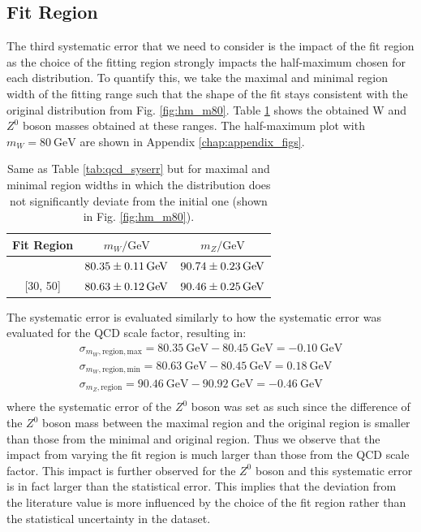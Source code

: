 \documentclass[a4paper]{report}
\numberwithin{equation}{section}
\begin{document}
\subsection{Fit Region}

The third systematic error that we need to consider is the impact of the fit region as the choice of the fitting region 
strongly impacts the half-maximum chosen for each distribution. To quantify this, we take the maximal and minimal 
region width of the fitting range such that the shape of the fit stays consistent with the original distribution from 
Fig. \ref{fig:hm_m80}. Table \ref{tab:fitregion_syserr} shows the obtained W and $Z^0$ boson masses obtained at these ranges. 
The half-maximum plot with $m_W = \SI{80}{\giga\electronvolt}$ are shown in Appendix \ref{chap:appendix_figs}.

\begin{table}
    \centering
    \begin{tabular}{|c|c|c|} \hline
    Fit Region &  $m_W / \si{\giga\electronvolt}$ & $m_Z / \si{\giga\electronvolt}$ \\ \hline
    [26, 65] & $\SI{80.35 \pm 0.11 }{\giga\electronvolt}$ & $\SI{90.74 \pm 0.23}{\giga\electronvolt}$ \\ 
    {[}30, 50{]} & $\SI{80.63 \pm 0.12 }{\giga\electronvolt}$ & $\SI{90.46 \pm 0.25}{\giga\electronvolt}$ \\ \hline 
    \end{tabular}
    \caption{Same as Table \ref{tab:qcd_syserr} but for maximal and minimal region widths in which the distribution 
    does not significantly deviate from the initial one (shown in Fig. \ref{fig:hm_m80}).}
    \label{tab:fitregion_syserr}
\end{table}
The systematic error is evaluated similarly to how the systematic error was evaluated for the QCD scale factor, resulting in:
\begin{align}
    \sigma_{m_W, \mathrm{region, max}} = \SI{80.35}{\giga\electronvolt} - \SI{80.45}{\giga\electronvolt} = -\SI{0.10}{\giga\electronvolt} \\
    \sigma_{m_W, \mathrm{region, min}} = \SI{80.63}{\giga\electronvolt} - \SI{80.45}{\giga\electronvolt} = \SI{0.18}{\giga\electronvolt} \\
    \sigma_{m_Z, \mathrm{region}} = \SI{90.46}{\giga\electronvolt} - \SI{90.92}{\giga\electronvolt} = -\SI{0.46}{\giga\electronvolt} \\
\end{align}
where the systematic error of the $Z^0$ boson was set as such since the difference of the $Z^0$ boson mass between the maximal
 region and the original region is smaller than those from the minimal and original region. Thus we observe that the impact from 
 varying the fit region is much larger than those from the QCD scale factor. This impact is further observed for the $Z^0$ boson and 
 this systematic error is in fact larger than the statistical error. This implies that the deviation from the literature value 
 is more influenced by the choice of the fit region rather than the statistical uncertainty in the dataset.
\end{document}
